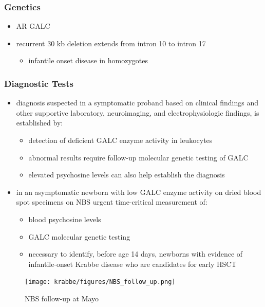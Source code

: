 \documentclass[12pt]{scrartcl}
\begin{document}
\subsubsection{Genetics}
\label{sec:orgf33f9ee}
\begin{itemize}
\item AR GALC
\item recurrent 30 kb deletion extends from intron 10 to intron 17
\begin{itemize}
\item infantile onset disease in homozygotes
\end{itemize}
\end{itemize}

\subsubsection{Diagnostic Tests}
\label{sec:org504257b}
\begin{itemize}
\item diagnosis suspected in a symptomatic proband based on clinical
findings and other supportive laboratory, neuroimaging, and
electrophysiologic findings, is established by:
\begin{itemize}
\item detection of deficient GALC enzyme activity in leukocytes
\item abnormal results require follow-up molecular genetic testing of GALC
\item elevated psychosine levels can also help establish the diagnosis
\end{itemize}

\item in an asymptomatic newborn with low GALC enzyme activity on dried
blood spot specimens on NBS urgent time-critical measurement of:
\begin{itemize}
\item blood psychosine levels
\item GALC molecular genetic testing
\item necessary to identify, before age 14 days, newborns with evidence
of infantile-onset Krabbe disease who are candidates for early
HSCT
\end{itemize}
\end{itemize}

\begin{figure}[htbp]
\centering
\texttt{[image: krabbe/figures/NBS\_follow\_up.png]}
\caption{\label{fig:org04b75c2}NBS follow-up at Mayo}
\end{figure}
\end{document}
